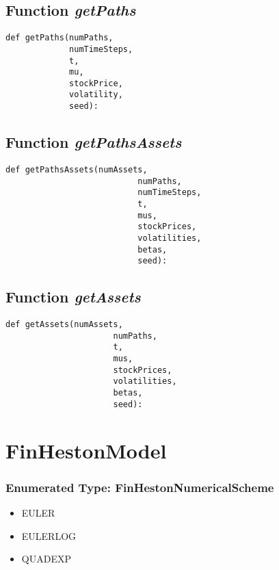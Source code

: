 \documentclass[twoside,11pt]{book}
\begin{document}
\subsection{Function {\it getPaths}}


\begin{lstlisting}
def getPaths(numPaths,
             numTimeSteps,
             t,
             mu,
             stockPrice,
             volatility,
             seed):
\end{lstlisting}

\subsection{Function {\it getPathsAssets}}


\begin{lstlisting}
def getPathsAssets(numAssets,
                           numPaths,
                           numTimeSteps,
                           t,
                           mus,
                           stockPrices,
                           volatilities,
                           betas,
                           seed):    
\end{lstlisting}

\subsection{Function {\it getAssets}}


\begin{lstlisting}
def getAssets(numAssets,
                      numPaths,
                      t,
                      mus,
                      stockPrices,
                      volatilities,
                      betas,
                      seed):    
\end{lstlisting}

\newpage
\section{FinHestonModel}

\subsubsection{Enumerated Type: FinHestonNumericalScheme}
\begin{itemize}
\item{EULER}
\item{EULERLOG}
\item{QUADEXP}
\end{itemize}
\end{document}
